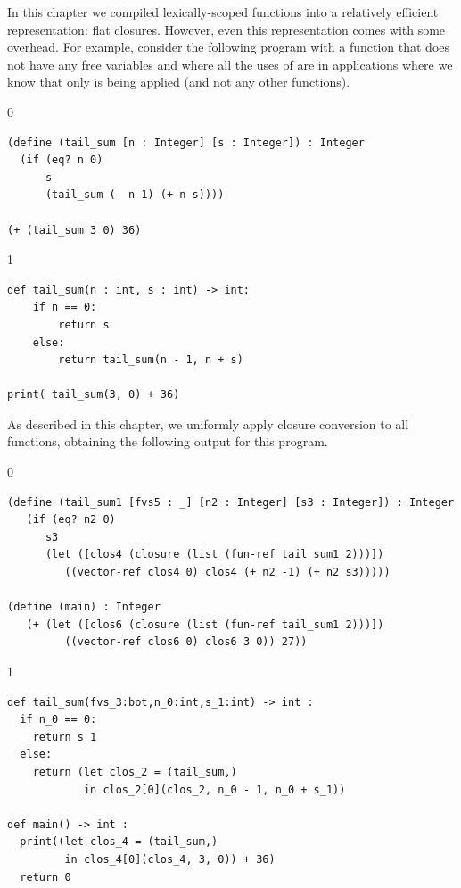 \documentclass[7x10]{TimesAPriori_MIT}%
\def\racketEd{0}
\def\pythonEd{1}
\def\edition{0}
\numberwithin{theorem}{chapter}
\numberwithin{definition}{chapter}
\numberwithin{equation}{chapter}
\begin{document}
In this chapter we compiled lexically-scoped functions into a
relatively efficient representation: flat closures. However, even this
representation comes with some overhead. For example, consider the
following program with a function  that does not have
any free variables and where all the uses of  are in
applications where we know that only  is being applied
(and not any other functions).
\begin{center}
\begin{minipage}{0.95\textwidth}
{\if\edition\racketEd  
\begin{lstlisting}
(define (tail_sum [n : Integer] [s : Integer]) : Integer
  (if (eq? n 0)
      s
      (tail_sum (- n 1) (+ n s))))

(+ (tail_sum 3 0) 36)
\end{lstlisting}
\fi}
{\if\edition\pythonEd
\begin{lstlisting}
def tail_sum(n : int, s : int) -> int:
    if n == 0:
        return s
    else:
        return tail_sum(n - 1, n + s)

print( tail_sum(3, 0) + 36)
\end{lstlisting}
\fi}
\end{minipage}
\end{center}
As described in this chapter, we uniformly apply closure conversion to
all functions, obtaining the following output for this program.
\begin{center}
\begin{minipage}{0.95\textwidth}
{\if\edition\racketEd  
\begin{lstlisting}
(define (tail_sum1 [fvs5 : _] [n2 : Integer] [s3 : Integer]) : Integer
   (if (eq? n2 0)
      s3
      (let ([clos4 (closure (list (fun-ref tail_sum1 2)))])
         ((vector-ref clos4 0) clos4 (+ n2 -1) (+ n2 s3)))))

(define (main) : Integer
   (+ (let ([clos6 (closure (list (fun-ref tail_sum1 2)))])
         ((vector-ref clos6 0) clos6 3 0)) 27))
\end{lstlisting}
\fi}
{\if\edition\pythonEd
\begin{lstlisting}
def tail_sum(fvs_3:bot,n_0:int,s_1:int) -> int :
  if n_0 == 0:
    return s_1
  else:
    return (let clos_2 = (tail_sum,)
            in clos_2[0](clos_2, n_0 - 1, n_0 + s_1))

def main() -> int :
  print((let clos_4 = (tail_sum,)
         in clos_4[0](clos_4, 3, 0)) + 36)
  return 0
\end{lstlisting}
\fi}
\end{minipage}
\end{center}
\end{document}
